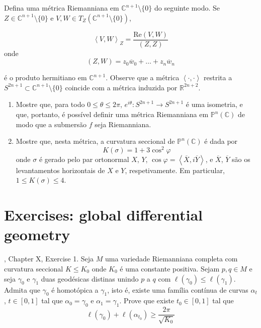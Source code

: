 \begin{exercise}
\label{exercise-curvature-of-CPn}
Defina uma métrica Riemanniana  em $\mathbb{C}^{n+1}\setminus\{0\}$ do
seguinte modo. Se $Z \in \mathbb{C}^{n+1}\setminus\{0\}$ e $V,W \in T_Z
(\mathbb{C}^{n+1}\setminus\{0\})$,

$$
\left<V,W\right>_Z=\frac{\text{Re}(V,W)}{(Z,Z)}
$$
onde 
$$
(Z,W)=z_0\overline{w}_0+\ldots+z_n\overline{w}_n
$$

é o produto hermitiano em $\mathbb{C}^{n+1}$. Observe que a métrica
$\left<\cdot,\cdot\right>$ restrita a $S^{2n+1}\subset
\mathbb{C}^{n+1}\setminus\{0\}$ coincide com a métrica induzida por
$\mathbb{R}^{2n+2}$.
\begin{enumerate}

\item Mostre que, para todo $0\leq \theta \leq 2\pi$, $e^{i\theta}:S^{2n+1}\to
S^{2n+1}$ é uma isometria, e que, portanto, é possível definir uma métrica
Riemanniana em $\mathbb{P}^n(\mathbb{C})$ de modo que a submersão $f$ seja
Riemanniana.

\item Mostre que, nesta métrica, a curvatura seccional de
$\mathbb{P}^n(\mathbb{C})$ é dada por
$$
K(\sigma)=1+3\cos^2\varphi
$$
onde $\sigma$ é gerado pelo par ortonormal $X$, $Y$, $\cos
\varphi=\left<\overline{X},i\overline{Y}\right>$, e $\overline{X}$,
$\overline{Y}$ são os levantamentos horizontais de $X$ e $Y$, respetivamente. Em
particular, $1 \leq  K(\sigma) \leq  4$.
\end{enumerate}
\end{exercise}

\section{Exercises: global differential geometry}
\label{section-exercises-global-differential-geometry}

\begin{exercise}
\label{exercise-Klingenberg-lemma}
\cite{doc}, Chapter X, Exercise 1. Seja $M$ uma variedade Riemanniana
completa com curvatura seccional $K \leq  K_0$ onde $K_0$ é uma constante
positiva. Sejam $p,q \in M$ e seja $\gamma_0$ e $\gamma_1$ duas geodésicas
distinas unindo $p$ a $q$ com  $\ell(\gamma_0) \leq  \ell(\gamma_1)$.
Admita que $\gamma_0$ é homotópica a $\gamma_1$, isto é, existe uma família
contínua de curvas $\alpha_t$, $t \in [0,1]$ tal que $\alpha_0 = \gamma_0$
e $\alpha_1=\gamma_1$. Prove que existe $t_0 \in [0,1]$ tal que
$$
\ell(\gamma_0)+\ell(\alpha_{t_0}) \geq  \frac{2\pi}{\sqrt{K_0} }
$$
\end{exercise}

